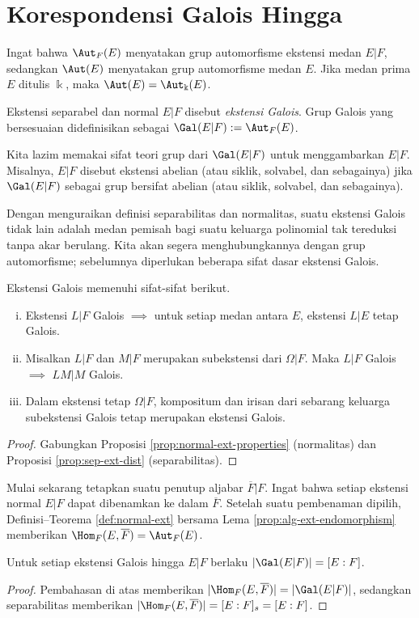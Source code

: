 \section{Korespondensi Galois Hingga}
Ingat bahwa $\Aut_F(E)$ menyatakan grup automorfisme ekstensi medan $E|F$, sedangkan $\Aut(E)$ menyatakan grup automorfisme medan $E$. Jika medan prima $E$ ditulis $\Bbbk$, maka $\Aut(E)=\Aut_\Bbbk(E)$.

\begin{definition}\label{def:Galois-ext} 
	Ekstensi separabel dan normal $E|F$ disebut \emph{ekstensi Galois}. Grup Galois yang bersesuaian didefinisikan sebagai $\Gal(E|F):=\Aut_F(E)$.
	
	Kita lazim memakai sifat teori grup dari $\Gal(E|F)$ untuk menggambarkan $E|F$. Misalnya, $E|F$ disebut ekstensi abelian (atau siklik, solvabel, dan sebagainya) jika $\Gal(E|F)$ sebagai grup bersifat abelian (atau siklik, solvabel, dan sebagainya).
\end{definition}
Dengan menguraikan definisi separabilitas dan normalitas, suatu ekstensi Galois tidak lain adalah medan pemisah bagi suatu keluarga polinomial tak tereduksi tanpa akar berulang. Kita akan segera menghubungkannya dengan grup automorfisme; sebelumnya diperlukan beberapa sifat dasar ekstensi Galois.

\begin{lemma}\label{prop:Galois-properties}
	Ekstensi Galois memenuhi sifat-sifat berikut.
	\begin{enumerate}[(i)]
		\item Ekstensi $L|F$ Galois $\implies$ untuk setiap medan antara $E$, ekstensi $L|E$ tetap Galois.
		\item Misalkan $L|F$ dan $M|F$ merupakan subekstensi dari $\Omega|F$. Maka $L|F$ Galois $\implies$ $LM|M$ Galois.
		\item Dalam ekstensi tetap $\Omega|F$, kompositum dan irisan dari sebarang keluarga subekstensi Galois tetap merupakan ekstensi Galois.
	\end{enumerate}
\end{lemma}
\begin{proof}
	Gabungkan Proposisi \ref{prop:normal-ext-properties} (normalitas) dan Proposisi \ref{prop:sep-ext-dist} (separabilitas).
\end{proof}

Mulai sekarang tetapkan suatu penutup aljabar $\overline{F}|F$. Ingat bahwa setiap ekstensi normal $E|F$ dapat dibenamkan ke dalam $\overline{F}$. Setelah suatu pembenaman dipilih, Definisi--Teorema \ref{def:normal-ext} bersama Lema \ref{prop:alg-ext-endomorphism} memberikan $\Hom_F(E,\overline{F})=\Aut_F(E)$.
\begin{proposition}\label{prop:Galois-order-degree}
	Untuk setiap ekstensi Galois hingga $E|F$ berlaku $|\Gal(E|F)|=[E:F]$.
\end{proposition}
\begin{proof}
	Pembahasan di atas memberikan $|\Hom_F(E,\overline{F})|=|\Gal(E|F)|$, sedangkan separabilitas memberikan $|\Hom_F(E,\overline{F})|=[E:F]_s=[E:F]$.
\end{proof}

